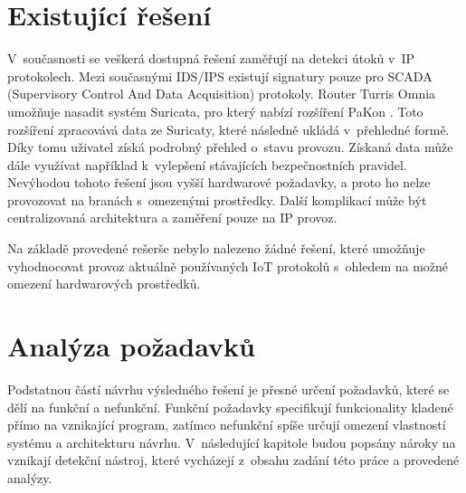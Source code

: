  \newpage
 \section{Existující řešení}
 V~současnosti se veškerá dostupná řešení zaměřují na detekci útoků v~IP protokolech. Mezi 
 současnými IDS/IPS existují signatury pouze pro SCADA (Supervisory Control And Data Acquisition)
 protokoly. Router Turris Omnia umožňuje nasadit systém Suricata, pro který nabízí rozšíření 
 PaKon \cite{pakon}. Toto rozšíření zpracovává data ze Suricaty, které následně ukládá v~přehledné formě.
 Díky tomu uživatel získá podrobný přehled o~stavu provozu. Získaná data může dále využívat 
 například k~vylepšení stávajících bezpečnostních pravidel. Nevýhodou tohoto řešení jsou 
 vyšší hardwarové požadavky, a proto ho nelze provozovat na branách s~omezenými 
 prostředky. Další komplikací může být centralizovaná architektura a zaměření pouze na 
 IP provoz.
 
 Na základě provedené rešerše nebylo nalezeno žádné řešení, které umožňuje vyhodnocovat 
 provoz aktuálně používaných IoT protokolů s~ohledem na možné omezení hardwarových
 prostředků.
 
 \newpage
 \section{Analýza požadavků}
 Podstatnou částí návrhu výsledného řešení je přesné určení požadavků, které se dělí na 
 funkční a nefunkční. Funkční požadavky specifikují funkcionality kladené přímo na vznikající
 program, zatímco nefunkční spíše určují omezení vlastností systému a architekturu návrhu.
V~následující kapitole budou popsány nároky na vznikají detekční nástroj, které vycházejí z~obsahu
 zadání této práce a provedené analýzy.
 
